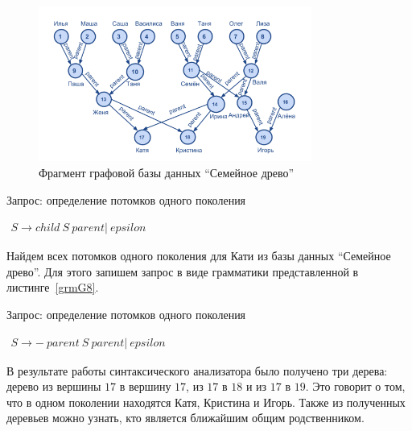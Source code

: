 \begin{figure}
 \centering
 \includegraphics[width=0.8\textwidth]{Smolina/pics/GraphFamily.png}
 \caption{Фрагмент графовой базы данных ``Семейное древо''}
 \label{GraphFamily}
\end{figure}

\begin{listing}
\caption{Запрос: определение потомков одного поколения}
\label{grmG7}
\centering
$\begin{array}{rl}
S \rightarrow child \ S \ parent| \ epsilon
\end{array}$
 \end{listing}

Найдем всех потомков одного поколения для Кати из базы данных ``Семейное древо''. Для этого запишем запрос в виде грамматики
представленной в листинге~\ref{grmG8}.

\begin{listing}
\caption{Запрос: определение потомков одного поколения}
\label{grmG8}
\centering
$\begin{array}{rl}
S \rightarrow - \ parent \ S \ parent| \ epsilon
\end{array}$
 \end{listing}

В результате работы синтаксического анализатора было получено три дерева: дерево из вершины $17$ в вершину $17$, из $17$ в $18$ и из $17$ в $19$. Это говорит о том, что в одном поколении находятся Катя, Кристина и Игорь. Также из полученных деревьев можно узнать, кто является ближайшим общим родственником.
